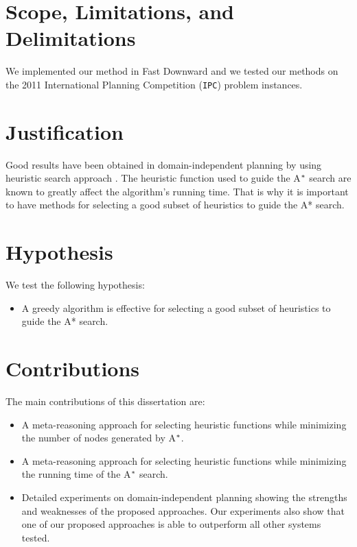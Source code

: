 \section{Scope, Limitations, and Delimitations}
\noindent
We implemented our method in Fast Downward \cite{helmert2006fast} and we tested our methods on the 2011 International Planning Competition (\texttt{IPC}) problem instances.

\section{Justification}
\noindent
Good results have been obtained in domain-independent planning by using heuristic search approach \cite{bonet2001planning}. The heuristic function used to guide the A$\sp{*}$ search are known to greatly affect the algorithm's running time. That is why it is important to have methods for selecting a good subset of heuristics to guide the A* search.


\section{Hypothesis}
\noindent
We test the following hypothesis:
\begin{itemize}
\item A greedy algorithm is effective for selecting a good subset of heuristics to guide the A* search.
\end{itemize}

\section{Contributions}
\noindent
The main contributions of this dissertation are:
\begin{itemize}
\item A meta-reasoning approach for selecting heuristic functions while minimizing the number of nodes generated by A$\sp{*}$.

\item A meta-reasoning approach for selecting heuristic functions while minimizing the running time of the A$\sp{*}$ search. 

\item Detailed experiments on domain-independent planning showing the strengths and weaknesses of the proposed approaches. Our experiments also show that one of our proposed approaches is able to outperform all other systems tested. 

\end{itemize}

